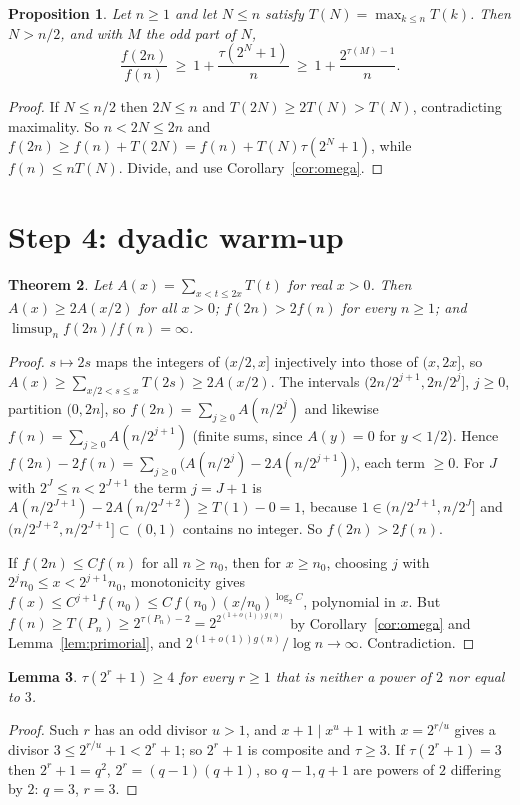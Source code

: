 \documentclass[11pt]{article}
\newtheorem{theorem}{Theorem}
\newtheorem{lemma}[theorem]{Lemma}
\newtheorem{proposition}[theorem]{Proposition}
\theoremstyle{remark}
\begin{document}
\begin{proposition}\label{prop:record}
Let $n\ge1$ and let $N\le n$ satisfy $T(N)=\max_{k\le n}T(k)$. Then $N>n/2$, and with $M$ the odd
part of $N$,
\[
  \frac{f(2n)}{f(n)}\ \ge\ 1+\frac{\tau(2^N+1)}{n}\ \ge\ 1+\frac{2^{\tau(M)-1}}{n}.
\]
\end{proposition}
\begin{proof}
If $N\le n/2$ then $2N\le n$ and $T(2N)\ge2T(N)>T(N)$, contradicting maximality. So
$n<2N\le2n$ and $f(2n)\ge f(n)+T(2N)=f(n)+T(N)\tau(2^N+1)$, while $f(n)\le nT(N)$. Divide, and use
Corollary~\ref{cor:omega}.
\end{proof}

\section{Step 4: dyadic warm-up}

\begin{theorem}\label{thm:dyadic}
Let $A(x)=\sum_{x<t\le2x}T(t)$ for real $x>0$. Then $A(x)\ge2A(x/2)$ for all $x>0$;
$f(2n)>2f(n)$ for every $n\ge1$; and $\limsup_{n}f(2n)/f(n)=\infty$.
\end{theorem}
\begin{proof}
$s\mapsto2s$ maps the integers of $(x/2,x]$ injectively into those of $(x,2x]$, so
$A(x)\ge\sum_{x/2<s\le x}T(2s)\ge2A(x/2)$.
The intervals $(2n/2^{j+1},2n/2^j]$, $j\ge0$, partition $(0,2n]$, so
$f(2n)=\sum_{j\ge0}A(n/2^j)$ and likewise $f(n)=\sum_{j\ge0}A(n/2^{j+1})$ (finite sums, since
$A(y)=0$ for $y<1/2$). Hence $f(2n)-2f(n)=\sum_{j\ge0}\big(A(n/2^j)-2A(n/2^{j+1})\big)$, each
term $\ge0$. For $J$ with $2^J\le n<2^{J+1}$ the term $j=J+1$ is
$A(n/2^{J+1})-2A(n/2^{J+2})\ge T(1)-0=1$, because $1\in(n/2^{J+1},n/2^J]$ and
$(n/2^{J+2},n/2^{J+1}]\subset(0,1)$ contains no integer. So $f(2n)>2f(n)$.

If $f(2n)\le Cf(n)$ for all $n\ge n_0$, then for $x\ge n_0$, choosing $j$ with
$2^jn_0\le x<2^{j+1}n_0$, monotonicity gives $f(x)\le C^{j+1}f(n_0)\le C\,f(n_0)(x/n_0)^{\log_2C}$,
polynomial in $x$. But $f(n)\ge T(P_n)\ge2^{\tau(P_n)-2}=2^{2^{(1+o(1))g(n)}}$ by
Corollary~\ref{cor:omega} and Lemma~\ref{lem:primorial}, and $2^{(1+o(1))g(n)}/\log n\to\infty$.
Contradiction.
\end{proof}

\begin{lemma}\label{lem:tau4}
$\tau(2^r+1)\ge4$ for every $r\ge1$ that is neither a power of $2$ nor equal to $3$.
\end{lemma}
\begin{proof}
Such $r$ has an odd divisor $u>1$, and $x+1\mid x^u+1$ with $x=2^{r/u}$ gives a divisor
$3\le2^{r/u}+1<2^r+1$; so $2^r+1$ is composite and $\tau\ge3$. If $\tau(2^r+1)=3$ then $2^r+1=q^2$,
$2^r=(q-1)(q+1)$, so $q-1,q+1$ are powers of $2$ differing by $2$: $q=3$, $r=3$.
\end{proof}
\end{document}
